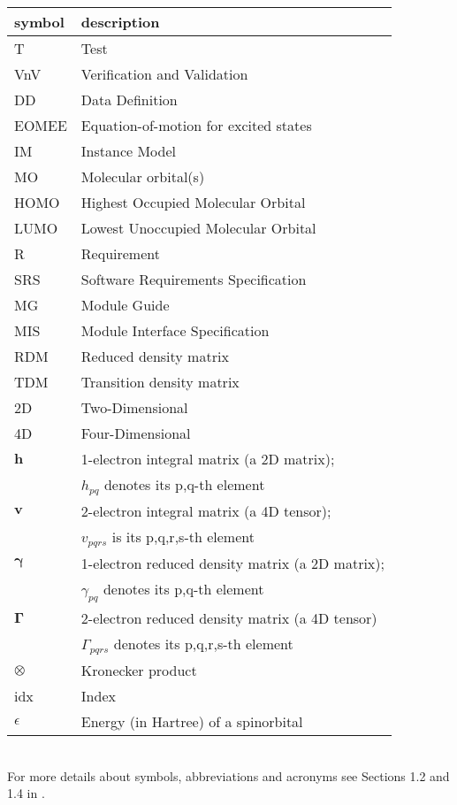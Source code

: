 \documentclass[12pt, titlepage]{article}
\begin{document}
\renewcommand{\arraystretch}{1.2}
\begin{tabular}{l l} 
  \toprule		
  \textbf{symbol} & \textbf{description}\\
  \midrule 
  T & Test\\
  VnV & Verification and Validation\\
  DD & Data Definition\\
  EOMEE& Equation-of-motion for excited states\\
  IM & Instance Model\\
  MO & Molecular orbital(s)\\
  HOMO& Highest Occupied Molecular Orbital\\
  LUMO& Lowest Unoccupied Molecular Orbital\\
  R & Requirement\\
  SRS & Software Requirements Specification\\
  MG & Module Guide\\
  MIS & Module Interface Specification\\
  RDM & Reduced density matrix\\
  TDM & Transition density matrix\\
  2D & Two-Dimensional\\
  4D & Four-Dimensional\\
  $\mathbf{h}$ & 1-electron integral matrix (a 2D matrix);\\
               & $h_{pq}$ denotes its p,q-th element\\
  $\mathbf{v}$ & 2-electron integral matrix (a 4D tensor);\\
               & $v_{pqrs}$ is its p,q,r,s-th element\\
  $\boldsymbol{\gamma}$ & 1-electron reduced density matrix (a 2D matrix);\\
                        &$\gamma_{pq}$ denotes its p,q-th element\\
  $\boldsymbol{\Gamma}$ & 2-electron reduced density matrix (a 4D tensor)\\
                        &$\Gamma_{pqrs}$ denotes its p,q,r,s-th element\\
  $\otimes$ & Kronecker product\\
  idx & Index\\
  $\epsilon$& Energy (in Hartree) of a spinorbital\\
  \bottomrule
\end{tabular}\\

For more details about symbols, abbreviations and acronyms see Sections 1.2 and 
1.4 in \cite{SRS2020}.
\end{document}
